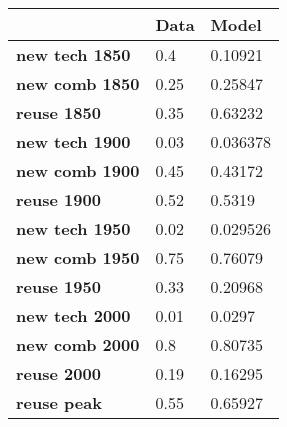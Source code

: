 \begin{tabular}{|l|l|l|}
\hline
&\textbf{Data}&\textbf{Model}\\\hline
\textbf{new tech 1850}&0.4&0.10921\\\hline
\textbf{new comb 1850}&0.25&0.25847\\\hline
\textbf{reuse 1850}&0.35&0.63232\\\hline
\textbf{new tech 1900}&0.03&0.036378\\\hline
\textbf{new comb 1900}&0.45&0.43172\\\hline
\textbf{reuse 1900}&0.52&0.5319\\\hline
\textbf{new tech 1950}&0.02&0.029526\\\hline
\textbf{new comb 1950}&0.75&0.76079\\\hline
\textbf{reuse 1950}&0.33&0.20968\\\hline
\textbf{new tech 2000}&0.01&0.0297\\\hline
\textbf{new comb 2000}&0.8&0.80735\\\hline
\textbf{reuse 2000}&0.19&0.16295\\\hline
\textbf{reuse peak}&0.55&0.65927\\\hline
\end{tabular}
